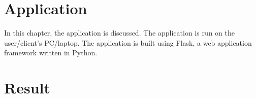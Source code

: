 \documentclass[12pt,letterpaper]{report}
\begin{document}
\chapter{Application}
\justify
In this chapter, the application is discussed. The application is run on the user/client's PC/laptop. The application is built using Flask, a web application framework written in Python.
\pagebreak


\chapter{Result}

\printbibliography
\end{document}

